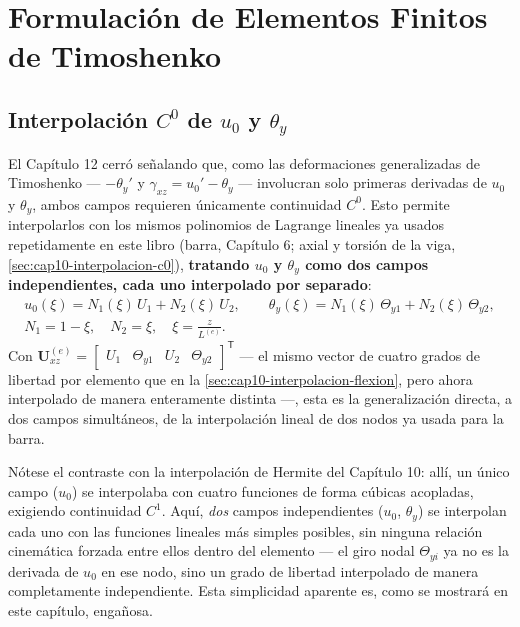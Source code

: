 \chapter{Formulación de Elementos Finitos de Timoshenko}
\label{chap:cap13-formulacion-fem-timoshenko}

\section{Interpolación \texorpdfstring{$C^0$}{C0} de \texorpdfstring{$u_0$}{u0} y \texorpdfstring{$\theta_y$}{theta\_y}}
\label{sec:cap13-interpolacion-c0}

El Capítulo 12 cerró señalando que, como las deformaciones generalizadas de Timoshenko --- $-\theta_y'$ y $\gamma_{xz}=u_0'-\theta_y$ --- involucran solo primeras derivadas de $u_0$ y $\theta_y$, ambos campos requieren únicamente continuidad $C^0$. Esto permite interpolarlos con los mismos polinomios de Lagrange lineales ya usados repetidamente en este libro (barra, Capítulo 6; axial y torsión de la viga, \cref{sec:cap10-interpolacion-c0}), \textbf{tratando $u_0$ y $\theta_y$ como dos campos independientes, cada uno interpolado por separado}:
\[
\begin{gathered}
u_0(\xi) = N_1(\xi)\,U_1 + N_2(\xi)\,U_2, \qquad
\theta_y(\xi) = N_1(\xi)\,\Theta_{y1} + N_2(\xi)\,\Theta_{y2}, \\[4pt]
N_1=1-\xi,\quad N_2=\xi,\quad \xi=\frac{z}{L^{(e)}} .
\end{gathered}
\]
Con $\bm U^{(e)}_{xz}=\begin{bmatrix}U_1&\Theta_{y1}&U_2&\Theta_{y2}\end{bmatrix}^{\mathsf T}$ --- el mismo vector de cuatro grados de libertad por elemento que en la \cref{sec:cap10-interpolacion-flexion}, pero ahora interpolado de manera enteramente distinta ---, esta es la generalización directa, a dos campos simultáneos, de la interpolación lineal de dos nodos ya usada para la barra.

\begin{observacion}
Nótese el contraste con la interpolación de Hermite del Capítulo 10: allí, un único campo ($u_0$) se interpolaba con cuatro funciones de forma cúbicas acopladas, exigiendo continuidad $C^1$. Aquí, \emph{dos} campos independientes ($u_0$, $\theta_y$) se interpolan cada uno con las funciones lineales más simples posibles, sin ninguna relación cinemática forzada entre ellos dentro del elemento --- el giro nodal $\Theta_{yi}$ ya no es la derivada de $u_0$ en ese nodo, sino un grado de libertad interpolado de manera completamente independiente. Esta simplicidad aparente es, como se mostrará en este capítulo, engañosa.
\end{observacion}

